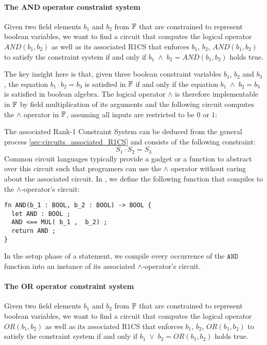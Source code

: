 \paragraph{The AND operator constraint system} Given two field elements $b_1$ and $b_2$ from $\mathbb{F}$ that are constrained to represent boolean variables, we want to find a circuit that computes the logical  operator $AND(b_1,b_2)$ as well as its associated R1CS that enforces $b_1$, $b_2$, $AND(b_1,b_2)$ to satisfy the constraint system if and only if $b_1\; \wedge \; b_2 =AND(b_1,b_2)$ holds true. 

The key insight here is that, given three boolean constraint variables $b_1$, $b_2$ and $b_3$, the equation $b_1\cdot b_2 = b_3$ is satisfied in $\mathbb{F}$ if and only if the equation $b_1\; \wedge \; b_2 = b_3$ is satisfied in boolean algebra. The logical operator $\wedge$ is therefore implementable in $\mathbb{F}$ by field multiplication of its arguments and the following circuit computes the $\wedge$ operator in $\mathbb{F}$, assuming all inputs are restricted to be $0$ or $1$:
\begin{center}
\end{center}
The associated Rank-1 Constraint System can be deduced from the general process \ref{sec:circuits_associated_R1CS} and consists of the following constraint:
\begin{equation}
 S_1 \cdot S_2 = S_3
\end{equation}
Common circuit languages typically provide a gadget or a function to abstract over this circuit such that programers can use the $\wedge$ operator without caring about the associated circuit. In , we define the following function that compiles to the $\wedge$-operator's circuit:
\begin{lstlisting}
fn AND(b_1 : BOOL, b_2 : BOOL) -> BOOL {
  let AND : BOOL ;
  AND <== MUL( b_1 ,  b_2) ;
  return AND ;
}
\end{lstlisting}
In the setup phase of a statement, we compile every occurrence of the $\mathtt{AND}$ function into an instance of its associated $\wedge$-operator's circuit.
\paragraph{The OR operator constraint system}
\label{def:boolean-or} Given two field elements $b_1$ and $b_2$ from $\mathbb{F}$ that are constrained to represent boolean variables, we want to find a circuit that computes the logical  operator $OR(b_1,b_2)$ as well as its associated R1CS that enforces $b_1$, $b_2$, $OR(b_1,b_2)$ to satisfy the constraint system if and only if $b_1\; \vee \; b_2 = OR(b_1,b_2)$ holds true. 


